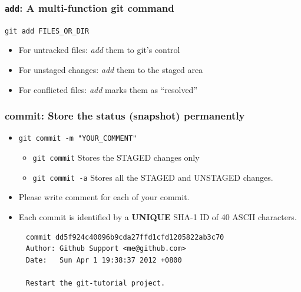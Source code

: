 \documentclass[11pt,ignorenonframetext,]{beamer}
\begin{document}
\begin{frame}[fragile, label=add]\frametitle{\texttt{add}: A multi-function git
command}

\texttt{git add FILES\_OR\_DIR}

\begin{itemize}
\item
  For untracked files: \emph{add} them to git's control
\item
  For unstaged changes: \emph{add} them to the staged area
\item
  For conflicted files: \emph{add} marks them as ``resolved''
\end{itemize}
\end{frame}

\begin{frame}[fragile, label=gitcommit]\frametitle{commit: Store the status (snapshot)
permanently}

\begin{itemize}
\item
  \texttt{git commit -m "YOUR\_COMMENT"}
  \begin{itemize}
  \item
    \texttt{git commit} Stores the STAGED changes only
  \item
    \texttt{git commit -a} Stores all the STAGED and UNSTAGED changes.
  \end{itemize}
\item
  Please write comment for each of your commit.
\item
  Each commit is identified by a \textbf{UNIQUE} SHA-1 ID of 40 ASCII
  characters.
\end{itemize}

{\small
\begin{verbatim}
     commit dd5f924c40096b9cda27ffd1cfd1205822ab3c70
     Author: Github Support <me@github.com>
     Date:   Sun Apr 1 19:38:37 2012 +0800

     Restart the git-tutorial project.
\end{verbatim}
}

\end{frame}
\end{document}
